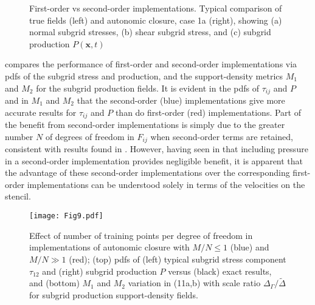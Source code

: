 %
\begin{figure}
	\centering %
	\label{F:CL14a}
\end{figure}
%
\begin{figure}
	\ContinuedFloat
	\centering %
	\label{F:CL14b}
\end{figure}
%
\begin{figure}
	\ContinuedFloat
	\centering %
	\label{F:CL14c}
\end{figure}
%
\begin{figure}
	\ContinuedFloat
	\caption{First-order vs second-order implementations. Typical comparison of  true fields (left) and autonomic closure, case 1a (right), showing (a) normal subgrid stresses, (b) shear subgrid stress, and (c) subgrid production $P(\mathbf{x},t)$}
	\label{F:CL14}
\end{figure}
%
%

 compares the performance of first-order and second-order implementations via pdfs of the subgrid stress and production, and the support-density metrics  $M_1$ and $M_2$ for the subgrid production fields. It is evident in the pdfs of  $\tau_{ij}$ and $P$ and in $M_1$   and $M_2$  that the second-order (blue) implementations give more accurate results for  $\tau_{ij}$ and $P$ than do first-order (red) implementations. Part of the benefit from second-order implementations is simply due to the greater number $N$ of degrees of freedom in  $F_{ij}$ when second-order terms are retained, consistent with results found in . However, having seen in   that including pressure in a second-order implementation provides negligible benefit, it is apparent that the advantage of these second-order implementations over the corresponding first-order implementations can be understood solely in terms of the velocities on the stencil. 

%
\begin{figure}
	\centering \hspace{-1.0cm}
	\texttt{[image: Fig9.pdf]}
	\caption{Effect of number of training points per degree of freedom in implementations of autonomic closure with $M/N \leq 1$ (blue) and $M/N \gg 1$  (red); (top) pdfs of (left) typical subgrid stress component $\tau_{12}$ and (right) subgrid production $P$ versus (black) exact results, and (bottom) $M_1$ and $M_2$ variation in (11a,b) with scale ratio $\Delta_{\Gamma}/\widetilde{\Delta}$ for subgrid production support-density fields.}
	\label{F:9}
\end{figure}
%
%

